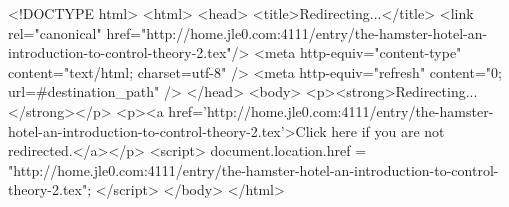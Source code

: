 <!DOCTYPE html>
<html>
<head>
<title>Redirecting...</title>
<link rel="canonical" href="http://home.jle0.com:4111/entry/the-hamster-hotel-an-introduction-to-control-theory-2.tex"/>
<meta http-equiv="content-type" content="text/html; charset=utf-8" />
<meta http-equiv="refresh" content="0; url=#{destination_path}" />
</head>
<body>
  <p><strong>Redirecting...</strong></p>
  <p><a href='http://home.jle0.com:4111/entry/the-hamster-hotel-an-introduction-to-control-theory-2.tex'>Click here if you are not redirected.</a></p>
  <script>
    document.location.href = "http://home.jle0.com:4111/entry/the-hamster-hotel-an-introduction-to-control-theory-2.tex";
  </script>
</body>
</html>

